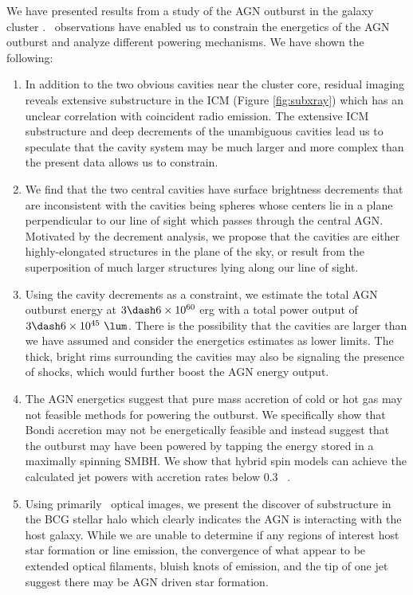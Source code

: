\documentclass[11pt, preprint]{aastex}
\begin{document}
We have presented results from a study of the AGN outburst in the
galaxy cluster \rbs. \cxo\ observations have enabled us to constrain
the energetics of the AGN outburst and analyze different powering
mechanisms. We have shown the following:
\begin{enumerate}
\item In addition to the two obvious cavities near the cluster core,
  residual imaging reveals extensive substructure in the ICM (Figure
  \ref{fig:subxray}) which has an unclear correlation with coincident
  radio emission. The extensive ICM substructure and deep decrements
  of the unambiguous cavities lead us to speculate that the cavity
  system may be much larger and more complex than the present data
  allows us to constrain.
\item We find that the two central cavities have surface brightness
  decrements that are inconsistent with the cavities being spheres
  whose centers lie in a plane perpendicular to our line of sight which
  passes through the central AGN. Motivated by the decrement analysis,
  we propose that the cavities are either highly-elongated structures
  in the plane of the sky, or result from the superposition of much
  larger structures lying along our line of sight.
\item Using the cavity decrements as a constraint, we estimate the
  total AGN outburst energy at $3 \dash 6 \times 10^{60}$ erg with a
  total power output of $3 \dash 6 \times 10^{45} ~\lum$. There is the
  possibility that the cavities are larger than we have assumed and
  consider the energetics estimates as lower limits. The thick, bright
  rims surrounding the cavities may also be signaling the presence of
  shocks, which would further boost the AGN energy output.
\item The AGN energetics suggest that pure mass accretion of cold or
  hot gas may not feasible methods for powering the outburst. We
  specifically show that Bondi accretion may not be energetically
  feasible and instead suggest that the outburst may have been powered
  by tapping the energy stored in a maximally spinning SMBH. We show
  that hybrid spin models can achieve the calculated jet powers with
  accretion rates below 0.3 ~\msolpy.
\item Using primarily \hst\ optical images, we present the discover of
  substructure in the BCG stellar halo which clearly indicates the AGN
  is interacting with the host galaxy. While we are unable to
  determine if any regions of interest host star formation or line
  emission, the convergence of what appear to be extended optical
  filaments, bluish knots of emission, and the tip of one jet suggest
  there may be AGN driven star formation.
\end{enumerate}
\end{document}
